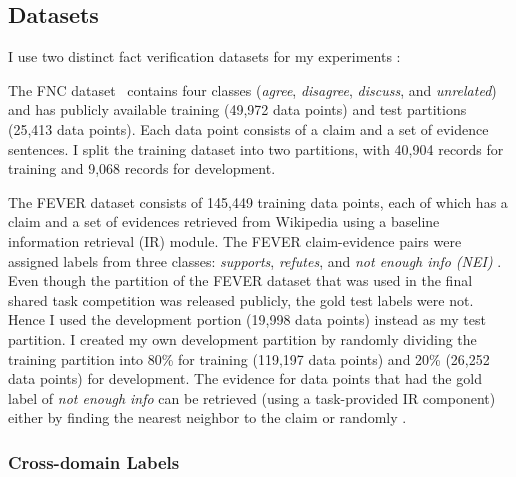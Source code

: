 \documentclass[compsoc,onecolumn]{IEEEtran}
\begin{document}
\subsection{Datasets}
I use two distinct fact verification datasets for my experiments :

{} 
The FNC dataset~\cite{pomerleau2017fake} contains four classes (\textit{agree}, \textit{disagree}, \textit{discuss}, and \textit{unrelated}) and has publicly available training (49,972 data points) and test partitions (25,413 data points). Each data point consists of a claim and a set of evidence sentences.  I split the training dataset into two partitions, with 40,904 records for training and 9,068 records for development.

{} The FEVER \cite{thorne2018fever} dataset consists of 145,449 training data points, each of which has a claim and a set of evidences retrieved from Wikipedia using a baseline information retrieval (IR) module.
The FEVER claim-evidence pairs were assigned labels from three classes: \textit{supports}, \textit{refutes}, and \textit{not enough info (NEI)} . Even though the partition of the FEVER dataset that was used in the final shared task competition was released publicly, the gold test labels were not. Hence I used the development portion (19,998 data points) instead as my test partition. I created my own development partition by randomly dividing the training partition into 80\% for training (119,197 data points) and 20\% (26,252 data points) for development.  The evidence for data points that had the gold label of \textit{not enough info} can be retrieved (using a task-provided IR component) either by finding the nearest neighbor to the claim or randomly \cite{thorne2018fever}. 


\subsubsection{Cross-domain Labels}
\label{sec:crossdomain}
\end{document}

